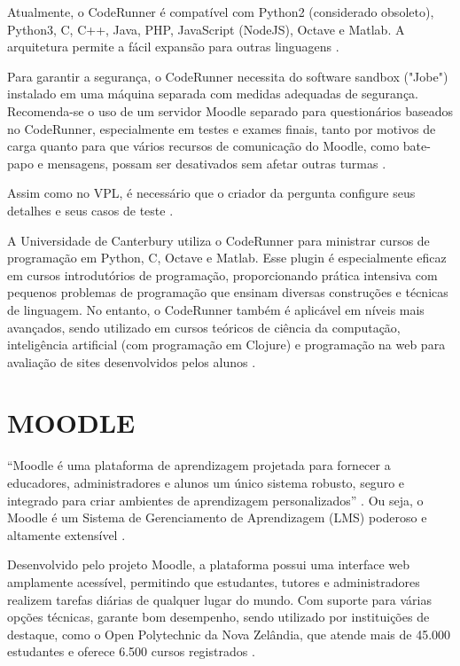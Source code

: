 Atualmente, o CodeRunner é compatível com Python2 (considerado obsoleto), Python3, C, C++, Java, PHP, JavaScript (NodeJS), Octave e Matlab. A arquitetura permite a fácil expansão para outras linguagens \cite{moodle}.

Para garantir a segurança, o CodeRunner necessita do software sandbox ("Jobe") instalado em uma máquina separada com medidas adequadas de segurança. Recomenda-se o uso de um servidor Moodle separado para questionários baseados no CodeRunner, especialmente em testes e exames finais, tanto por motivos de carga quanto para que vários recursos de comunicação do Moodle, como bate-papo e mensagens, possam ser desativados sem afetar outras turmas \cite{coderunner}.

Assim como no VPL, é necessário que o criador da pergunta configure seus detalhes e seus casos de teste \cite{coderunner}.

A Universidade de Canterbury utiliza o CodeRunner para ministrar cursos de programação em Python, C, Octave e Matlab. Esse plugin é especialmente eficaz em cursos introdutórios de programação, proporcionando prática intensiva com pequenos problemas de programação que ensinam diversas construções e técnicas de linguagem. No entanto, o CodeRunner também é aplicável em níveis mais avançados, sendo utilizado em cursos teóricos de ciência da computação, inteligência artificial (com programação em Clojure) e programação na web para avaliação de sites desenvolvidos pelos alunos \cite[p.~48]{lobbharlow}.

\section{MOODLE}

“Moodle é uma plataforma de aprendizagem projetada para fornecer a educadores, administradores e alunos um único sistema robusto, seguro e integrado para criar ambientes de aprendizagem personalizados” \cite{moodle}. Ou seja, o Moodle é um Sistema de Gerenciamento de Aprendizagem (LMS) poderoso e altamente extensível \cite{moodle}. 

Desenvolvido pelo projeto Moodle, a plataforma possui uma interface web amplamente acessível, permitindo que estudantes, tutores e administradores realizem tarefas diárias de qualquer lugar do mundo. Com suporte para várias opções técnicas, garante bom desempenho, sendo utilizado por instituições de destaque, como o Open Polytechnic da Nova Zelândia, que atende mais de 45.000 estudantes e oferece 6.500 cursos registrados \cite{moodle}. 

